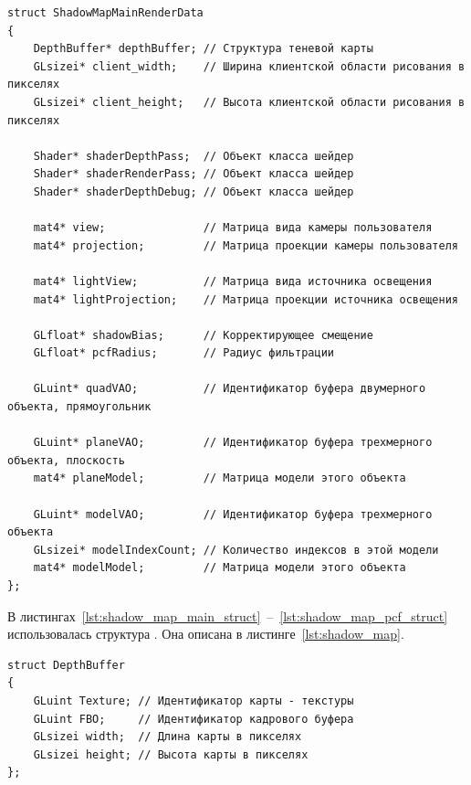 \begin{center}
\captionsetup{justification=centering, singlelinecheck=off}
\begin{lstlisting}[label=lst:shadow_map_pcf_struct, caption={Структура параметров для алгоритмов теневых карт с фильтрацией}]
struct ShadowMapMainRenderData
{
    DepthBuffer* depthBuffer; // Структура теневой карты
    GLsizei* client_width;    // Ширина клиентской области рисования в пикселях
    GLsizei* client_height;   // Высота клиентской области рисования в пикселях

    Shader* shaderDepthPass;  // Объект класса шейдер
    Shader* shaderRenderPass; // Объект класса шейдер
    Shader* shaderDepthDebug; // Объект класса шейдер

    mat4* view;               // Матрица вида камеры пользователя
    mat4* projection;         // Матрица проекции камеры пользователя

    mat4* lightView;          // Матрица вида источника освещения
    mat4* lightProjection;    // Матрица проекции источника освещения

    GLfloat* shadowBias;      // Корректирующее смещение
    GLfloat* pcfRadius;       // Радиус фильтрации

    GLuint* quadVAO;          // Идентификатор буфера двумерного объекта, прямоугольник

    GLuint* planeVAO;         // Идентификатор буфера трехмерного объекта, плоскость
    mat4* planeModel;         // Матрица модели этого объекта

    GLuint* modelVAO;         // Идентификатор буфера трехмерного объекта
    GLsizei* modelIndexCount; // Количество индексов в этой модели
    mat4* modelModel;         // Матрица модели этого объекта
};
\end{lstlisting}
\end{center}

В листингах~\ref{lst:shadow_map_main_struct}~--~\ref{lst:shadow_map_pcf_struct}
использовалась структура . Она описана в
листинге~\ref{lst:shadow_map}.

\begin{center}
\captionsetup{justification=centering, singlelinecheck=off}
\begin{lstlisting}[label=lst:shadow_map, caption={Структура теневой карты}]
struct DepthBuffer
{
    GLuint Texture; // Идентификатор карты - текстуры
    GLuint FBO;     // Идентификатор кадрового буфера
    GLsizei width;  // Длина карты в пикселях
    GLsizei height; // Высота карты в пикселях
};
\end{lstlisting}
\end{center}

